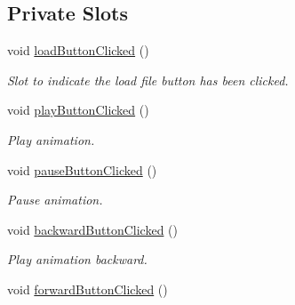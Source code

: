 \subsection*{Private Slots}
\begin{DoxyCompactItemize}
\item 
void \hyperlink{class_main_window_a20e3c6dd7618b779de104d0e96664cb7}{load\+Button\+Clicked} ()\hypertarget{class_main_window_a20e3c6dd7618b779de104d0e96664cb7}{}\label{class_main_window_a20e3c6dd7618b779de104d0e96664cb7}

\begin{DoxyCompactList}\small\item\em Slot to indicate the load file button has been clicked. \end{DoxyCompactList}\item 
void \hyperlink{class_main_window_ace8df04a90094e4ea8648713e9238663}{play\+Button\+Clicked} ()\hypertarget{class_main_window_ace8df04a90094e4ea8648713e9238663}{}\label{class_main_window_ace8df04a90094e4ea8648713e9238663}

\begin{DoxyCompactList}\small\item\em Play animation. \end{DoxyCompactList}\item 
void \hyperlink{class_main_window_ad632c98f6a0bf3fcc745d5cca8e08b78}{pause\+Button\+Clicked} ()\hypertarget{class_main_window_ad632c98f6a0bf3fcc745d5cca8e08b78}{}\label{class_main_window_ad632c98f6a0bf3fcc745d5cca8e08b78}

\begin{DoxyCompactList}\small\item\em Pause animation. \end{DoxyCompactList}\item 
void \hyperlink{class_main_window_a49c40ff01b2f365eb30bee4986497d36}{backward\+Button\+Clicked} ()\hypertarget{class_main_window_a49c40ff01b2f365eb30bee4986497d36}{}\label{class_main_window_a49c40ff01b2f365eb30bee4986497d36}

\begin{DoxyCompactList}\small\item\em Play animation backward. \end{DoxyCompactList}\item 
void \hyperlink{class_main_window_a8729c1dd75e13d29feadaefc2c22af68}{forward\+Button\+Clicked} ()\hypertarget{class_main_window_a8729c1dd75e13d29feadaefc2c22af68}{}\label{class_main_window_a8729c1dd75e13d29feadaefc2c22af68}


\end{DoxyCompactItemize}
